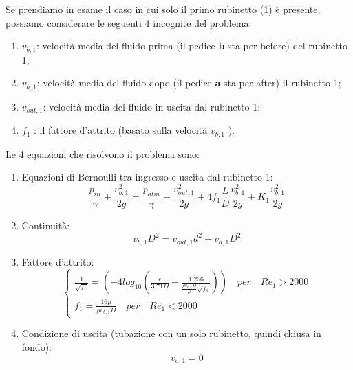 \documentclass[oneside]{article}
\begin{document}
Se prendiamo in esame il caso in cui solo il primo rubinetto (1) è presente, possiamo
considerare le seguenti 4 incognite del problema:

\begin{enumerate}
    \item $v_{b,1}$: velocità media del fluido prima (il pedice \textbf{b} sta per
       before) del rubinetto 1;
    \item $v_{a,1}$: velocità media del fluido dopo (il pedice \textbf{a} sta per after)
       il rubinetto 1;
    \item $v_{out,1}$: velocità media del fluido in uscita dal rubinetto 1;
    \item $f_{1}$ : il fattore d’attrito (basato sulla velocità $v_{b,1}$ ).
\end{enumerate}

Le 4 equazioni che risolvono il problema sono:

\begin{enumerate}
   \item Equazioni di Bernoulli tra ingresso e uscita dal rubinetto 1:
      \begin{equation*}
         \frac{p_{in}}{\gamma} + \frac{v_{b,1}^{2}}{2g} = \frac{p_{atm}}{\gamma} +
         \frac{v_{out,1}^{2}}{2g} + 4f_{1}\frac{L}{D}\frac{v_{b,1}^{2}}{2g} +
         K_{1}\frac{v_{b,1}^{2}}{2g}
      \end{equation*}

   \item Continuità:
      \begin{equation*}
         v_{b,1}D^{2} = v_{out,1}d^{2} + v_{a,1}D^{2}
      \end{equation*}

   \item Fattore d'attrito:
      \begin{equation*}
         \begin{cases}
            \frac{1}{\sqrt{f_{1}}} =
            \left(-4log_{10}\left(\frac{\epsilon}{3.71D}+\frac{1.256}{\frac{\rho
            v_{b,1}D}{\mu}\sqrt{f_{1}}}\right)\right) \quad per \quad Re_{1} > 2000 \\
            f_{1} = \frac{16 \mu}{\rho v_{b,1}D} \quad per \quad Re_{1} < 2000
         \end{cases}
      \end{equation*}

   \item Condizione di uscita (tubazione con un solo rubinetto, quindi chiusa in fondo):
      \begin{equation*}
         v_{a,1} = 0
      \end{equation*}
\end{enumerate}
\end{document}
